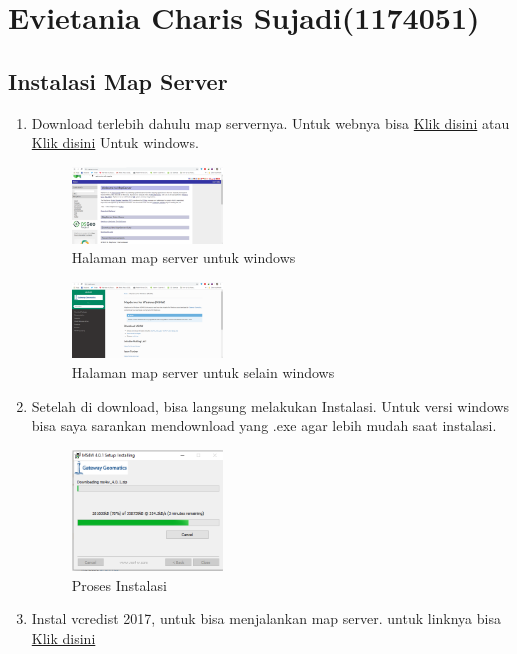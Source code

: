 \section{Evietania Charis Sujadi(1174051)}
\subsection{Instalasi Map Server}
\begin{enumerate}
    \item Download terlebih dahulu map servernya. Untuk webnya bisa \href{https://mapserver.org/}{Klik disini} atau \href{https://ms4w.com/}{Klik disini} Untuk windows.
    \hfill\break
    \begin{figure}[H]
		\includegraphics[width=4cm]{figures/1174051/4/1.png}
		\centering
		\caption{Halaman map server untuk windows}
    \end{figure}
    \hfill\break
    \begin{figure}[H]
		\includegraphics[width=4cm]{figures/1174051/4/2.png}
		\centering
		\caption{Halaman map server untuk selain windows}
    \end{figure}
    \item Setelah di download, bisa langsung melakukan Instalasi. Untuk versi windows bisa saya sarankan mendownload yang .exe agar lebih mudah saat instalasi.
    \hfill\break
    \begin{figure}[H]
		\includegraphics[width=4cm]{figures/1174051/4/3.png}
		\centering
		\caption{Proses Instalasi}
    \end{figure}
    \item Instal vcredist 2017, untuk bisa menjalankan map server. untuk linknya bisa \href{https://support.microsoft.com/id-id/help/2977003/the-latest-supported-visual-c-downloads}{Klik disini}
\end{enumerate}
